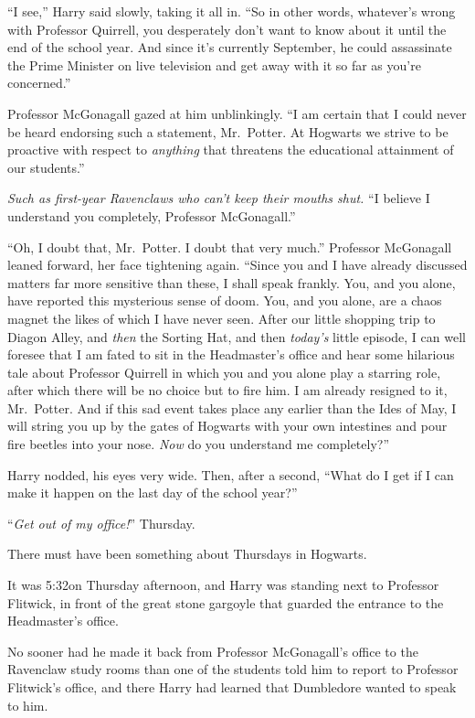 “I see,” Harry said slowly, taking it all in. “So in other words, whatever’s wrong with Professor Quirrell, you desperately don’t want to know about it until the end of the school year. And since it’s currently September, he could assassinate the Prime Minister on live television and get away with it so far as you’re concerned.”

Professor McGonagall gazed at him unblinkingly. “I am certain that I could never be heard endorsing such a statement, Mr.~Potter. At Hogwarts we strive to be proactive with respect to \emph{anything} that threatens the educational attainment of our students.”

\emph{Such as first-year Ravenclaws who can’t keep their mouths shut.} “I believe I understand you completely, Professor McGonagall.”

 “Oh, I doubt that, Mr.~Potter. I doubt that very much.” Professor McGonagall leaned forward, her face tightening again. “Since you and I have already discussed matters far more sensitive than these, I shall speak frankly. You, and you alone, have reported this mysterious sense of doom. You, and you alone, are a chaos magnet the likes of which I have never seen. After our little shopping trip to Diagon Alley, and \emph{then} the Sorting Hat, and then \emph{today’s} little episode, I can well foresee that I am fated to sit in the Headmaster’s office and hear some hilarious tale about Professor Quirrell in which you and you alone play a starring role, after which there will be no choice but to fire him. I am already resigned to it, Mr.~Potter. And if this sad event takes place any earlier than the Ides of May, I will string you up by the gates of Hogwarts with your own intestines and pour fire beetles into your nose. \emph{Now} do you understand me completely?”

Harry nodded, his eyes very wide. Then, after a second, “What do I get if I can make it happen on the last day of the school year?”

“\emph{Get out of my office!}”
\sbreak
Thursday.

There must have been something about Thursdays in Hogwarts.

It was 5:32\PM on Thursday afternoon, and Harry was standing next to Professor Flitwick, in front of the great stone gargoyle that guarded the entrance to the Headmaster’s office.

No sooner had he made it back from Professor McGonagall’s office to the Ravenclaw study rooms than one of the students told him to report to Professor Flitwick’s office, and there Harry had learned that Dumbledore wanted to speak to him.

